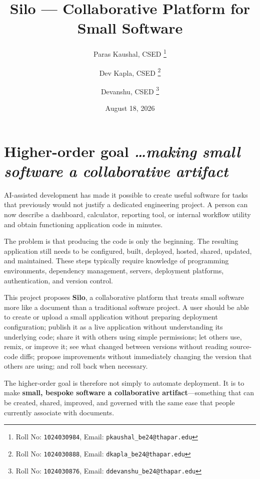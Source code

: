 \documentclass[11pt,a4paper]{article}
\title{Silo --- Collaborative Platform for Small Software}
\author{
Paras Kaushal, CSED%
\thanks{Roll No: \texttt{1024030984},
Email: \texttt{pkaushal\_be24@thapar.edu}}
\and
Dev Kapla, CSED%
\thanks{Roll No: \texttt{1024030888},
Email: \texttt{dkapla\_be24@thapar.edu}}
\and
Devanshu, CSED%
\thanks{Roll No: \texttt{1024030876},
Email: \texttt{ddevanshu\_be24@thapar.edu}}
}
\date{August 18, 2026}
\newcommand{\BvrHint}[1]{%
{\normalfont\normalsize\itshape\hfill #1}}
\begin{document}
\maketitle


\section{Higher-order goal%
\BvrHint{\ldots making small software a collaborative artifact}}

AI-assisted development has made it possible to create useful software for tasks that
previously would not justify a dedicated engineering project. A person can now describe a
dashboard, calculator, reporting tool, or internal workflow utility and obtain functioning
application code in minutes.

The problem is that producing the code is only the beginning. The resulting application
still needs to be configured, built, deployed, hosted, shared, updated, and maintained.
These steps typically require knowledge of programming environments, dependency management,
servers, deployment platforms, authentication, and version control.

This project proposes \textbf{Silo}, a collaborative platform that treats small software
more like a document than a traditional software project. A user should be able to create
or upload a small application without preparing deployment configuration; publish it as a
live application without understanding its underlying code; share it with others using
simple permissions; let others use, remix, or improve it; see what changed between versions
without reading source-code diffs; propose improvements without immediately changing the
version that others are using; and roll back when necessary.

The higher-order goal is therefore not simply to automate deployment. It is to make
\textbf{small, bespoke software a collaborative artifact}---something that can be created,
shared, improved, and governed with the same ease that people currently associate with
documents.

\end{document}
